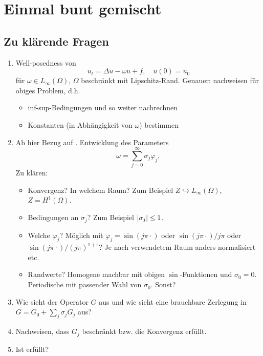 
\chapter{Einmal bunt gemischt}

\section{Zu klärende Fragen} %
\label{sub:zu_kl_rende_fragen}

\begin{enumerate}
    \item Well-posedness von
    \begin{equation}
        u_{t} = \Delta u - \omega u + f, \quad u(0) = u_{0}
    \end{equation}
    für $\omega \in L_{\infty}(\Omega)$, $\Omega$ beschränkt mit Lipschitz-Rand.
    Genauer: \cite[Theorem 5.1]{Schwab:2009ec}  nachweisen für obiges Problem, d.h.
    \begin{itemize}
        \item inf-sup-Bedingungen und so weiter nachrechnen 
        \item Konstanten (in Abhängigkeit von $\omega$) bestimmen 
    \end{itemize}
    \item {}Ab hier Bezug auf \cite{Kunoth:2013ef}.
        Entwicklung des Parameters
    \begin{equation}
        \omega = \sum_{j = 0}^{\infty} \sigma_{j} \varphi_{j},
    \end{equation}
    Zu klären:
    \begin{itemize}
        \item Konvergenz? In welchem Raum? Zum Beispiel $Z \hookrightarrow L_{\infty}(\Omega)$, $Z = H^{1}(\Omega)$.
        \item Bedingungen an $\sigma_{j}$? Zum Beispiel $\lvert\sigma_{j}\rvert \leq 1$.
        \item Welche $\varphi_{j}$? Möglich mit $\varphi_{j} = \sin(j \pi \cdot)$ oder $\sin(j \pi \cdot) / j \pi$ oder $\sin(j \pi \cdot) / (j \pi)^{1 + \epsilon}$? Je nach verwendetem Raum anders normalisiert etc.
        \item Randwerte? Homogene machbar mit obigen $\sin$-Funktionen und $\sigma_{0} = 0$. Periodische mit passender Wahl von $\sigma_{0}$. Sonst?
    \end{itemize}
    \item Wie sieht der Operator $G$ aus und wie sieht eine brauchbare Zerlegung in $G = G_{0} + \sum_{j} \sigma_{j} G_{j}$ aus?
    \item Nachweisen, dass $G_{j}$ beschränkt bzw. die Konvergenz erfüllt.
    \item Ist \cite[Assumption 2]{Kunoth:2013ef} erfüllt?
\end{enumerate}

